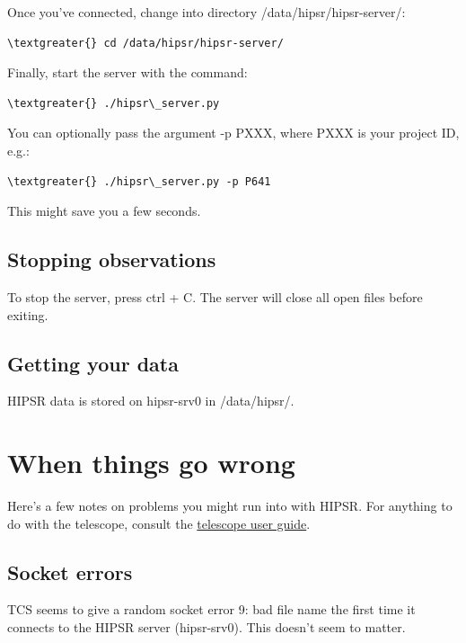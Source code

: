 \documentclass[letterpaper,10pt,english]{sphinxmanual}
\begin{document}
Once you've connected, change into directory /data/hipsr/hipsr-server/:

\begin{Verbatim}[commandchars=\\\{\}]
\textgreater{} cd /data/hipsr/hipsr-server/
\end{Verbatim}

Finally, start the server with the command:

\begin{Verbatim}[commandchars=\\\{\}]
\textgreater{} ./hipsr\_server.py
\end{Verbatim}

You can optionally pass the argument -p PXXX, where PXXX is your project ID, e.g.:

\begin{Verbatim}[commandchars=\\\{\}]
\textgreater{} ./hipsr\_server.py -p P641
\end{Verbatim}

This might save you a few seconds.


\subsection{Stopping observations}
\label{user_guide:stopping-observations}
To stop the server, press ctrl + C. The server will close all open files before exiting.


\subsection{Getting your data}
\label{user_guide:getting-your-data}
HIPSR data is stored on hipsr-srv0 in /data/hipsr/.


\section{When things go wrong}
\label{user_guide:when-things-go-wrong}
Here's a few notes on problems you might run into with HIPSR. For anything to do with the
telescope, consult the \href{http://www.parkes.atnf.csiro.au/observing/documentation/user\_guide/}{telescope user guide}.


\subsection{Socket errors}
\label{user_guide:socket-errors}
TCS seems to give a random socket error 9: bad file name the first time
it connects to the HIPSR server (hipsr-srv0). This doesn't seem to matter.
\end{document}
